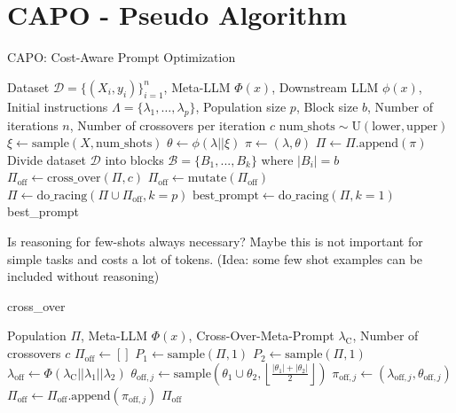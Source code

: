 \section{CAPO - Pseudo Algorithm}

\begin{algorithm}[h]
    \caption{CAPO: Cost-Aware Prompt Optimization}
    \begin{algorithmic}[1]
        \Require Dataset $\mathcal{D} = \{(X_i, y_i)\}_{i=1}^n$, Meta-LLM $\Phi(x)$,
        Downstream LLM $\phi(x)$, Initial instructions $\Lambda = \{\lambda_1, \dots, \lambda_p\}$,
        Population size $p$, Block size $b$, Number of iterations $n$, Number of crossovers per iteration $c$
        \For{$\lambda \in \Lambda$}
        \State $\text{num\_shots} \sim \text{U}(\text{lower}, \text{upper})$
        \State $\xi \gets \text{sample}(X, \text{num\_shots})$ 
        \State $\theta \gets \phi(\lambda||\xi)$   
        \State $\pi \gets (\lambda, \theta)$
        \State $\Pi \gets \Pi\text{.append}(\pi)$
        \EndFor
        \State Divide dataset $\mathcal{D}$ into blocks $\mathcal{B} = \{B_1, ..., B_k\}$ where $|B_i| = b$
        \State $\Pi_{\text{off}} \gets \text{cross\_over}(\Pi, c)$
        \State $\Pi_{\text{off}} \gets \text{mutate}(\Pi_{\text{off}})$
        \State $\Pi \gets \text{do\_racing}(\Pi \cup \Pi_\text{off}, k=p)$
        \EndFor
        \State $\text{best\_prompt} \gets \text{do\_racing}(\Pi, k=1)$
        \State \Return best\_prompt
    \end{algorithmic}
\end{algorithm}

\noindent Is reasoning for few-shots always necessary? Maybe this is not important for simple tasks and costs a lot of tokens. (Idea: some few shot examples can be included without reasoning)\\
\newpage

\begin{algorithm}[h]
    \caption{cross\_over}
    \begin{algorithmic}[1]
        \Require Population $\Pi$, Meta-LLM $\Phi(x)$, Cross-Over-Meta-Prompt $\lambda_{\text{C}}$, Number of crossovers $c$
        \State $\Pi_{\text{off}} \gets  []$
        \State $P_1 \gets \text{sample}(\Pi, 1)$ 
        \State $P_2 \gets \text{sample}(\Pi, 1)$ 
        \State $\lambda_{\text{off}} \gets \Phi(\lambda_{\text{C}} || \lambda_1 || \lambda_2)$ 
        \State $\theta_{\text{off},j} \gets \text{sample}(\theta_1 \cup \theta_2, \left\lfloor\frac{|\theta_1|+|\theta_2|}{2}\right\rfloor)$ 
        \State $\pi_{\text{off},j} \gets (\lambda_{\text{off},j}, \theta_{\text{off},j})$
        \State $\Pi_{\text{off}} \gets \Pi_{\text{off}}.\text{append}(\pi_{\text{off},j})$
        \EndFor
        \State \Return $\Pi_{\text{off}}$
    \end{algorithmic}
\end{algorithm}

